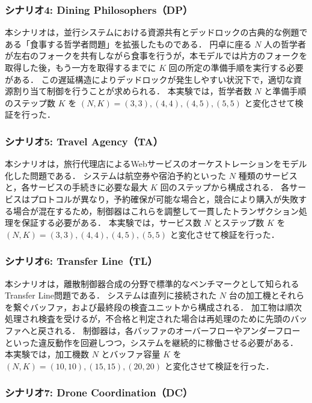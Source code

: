 \documentclass[a4paper,11pt,oneside,openany,report,dvipdfmx]{jsbook}
\begin{document}
\subsubsection{シナリオ4: Dining Philosophers（DP）}

本シナリオは，並行システムにおける資源共有とデッドロックの古典的な例題である「食事する哲学者問題」を拡張したものである．
円卓に座る $N$ 人の哲学者が左右のフォークを共有しながら食事を行うが，本モデルでは片方のフォークを取得した後，もう一方を取得するまでに $K$ 回の所定の準備手順を実行する必要がある．
この遅延構造によりデッドロックが発生しやすい状況下で，適切な資源割り当て制御を行うことが求められる．
本実験では，哲学者数 $N$ と準備手順のステップ数 $K$ を $(N, K) = (3, 3), (4, 4), (4, 5), (5, 5)$ と変化させて検証を行った．

\subsubsection{シナリオ5: Travel Agency（TA）}

本シナリオは，旅行代理店によるWebサービスのオーケストレーションをモデル化した問題である．
システムは航空券や宿泊予約といった $N$ 種類のサービスと，各サービスの手続きに必要な最大 $K$ 回のステップから構成される．
各サービスはプロトコルが異なり，予約確保が可能な場合と，競合により購入が失敗する場合が混在するため，制御器はこれらを調整して一貫したトランザクション処理を保証する必要がある．
本実験では，サービス数 $N$ とステップ数 $K$ を $(N, K) = (3, 3), (4, 4), (4, 5), (5, 5)$ と変化させて検証を行った．

\subsubsection{シナリオ6: Transfer Line（TL）}

本シナリオは，離散制御器合成の分野で標準的なベンチマークとして知られるTransfer Line問題である．
システムは直列に接続された $N$ 台の加工機とそれらを繋ぐバッファ，および最終段の検査ユニットから構成される．
加工物は順次処理され検査を受けるが，不合格と判定された場合は再処理のために先頭のバッファへと戻される．
制御器は，各バッファのオーバーフローやアンダーフローといった違反動作を回避しつつ，システムを継続的に稼働させる必要がある．
本実験では，加工機数 $N$ とバッファ容量 $K$ を $(N, K) = (10, 10), (15, 15), (20, 20)$ と変化させて検証を行った．

\subsubsection{シナリオ7: Drone Coordination（DC）}
\end{document}
